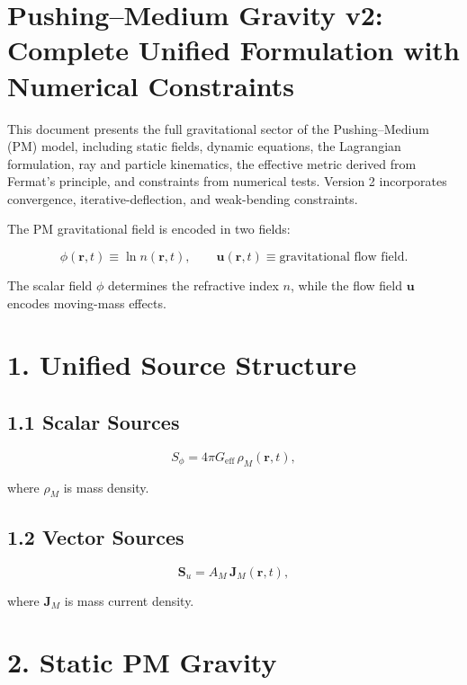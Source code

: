 \documentclass{article}
\begin{document}
\section*{Pushing--Medium Gravity v2: Complete Unified Formulation with Numerical Constraints}

This document presents the full gravitational sector of the Pushing--Medium (PM)
model, including static fields, dynamic equations, the Lagrangian formulation,
ray and particle kinematics, the effective metric derived from Fermat’s
principle, and constraints from numerical tests. Version 2 incorporates
convergence, iterative-deflection, and weak-bending constraints.

The PM gravitational field is encoded in two fields:



\[
\phi(\mathbf r,t) \equiv \ln n(\mathbf r,t),
\qquad
\mathbf u(\mathbf r,t) \equiv \text{gravitational flow field}.
\]



The scalar field $\phi$ determines the refractive index $n$, while the flow
field $\mathbf u$ encodes moving-mass effects.

\section*{1. Unified Source Structure}

\subsection*{1.1 Scalar Sources}



\[
S_\phi = 4\pi G_{\mathrm{eff}}\,\rho_M(\mathbf r,t),
\]



where $\rho_M$ is mass density.

\subsection*{1.2 Vector Sources}



\[
\mathbf S_u = A_M\,\mathbf J_M(\mathbf r,t),
\]



where $\mathbf J_M$ is mass current density.

\section*{2. Static PM Gravity}
\end{document}

